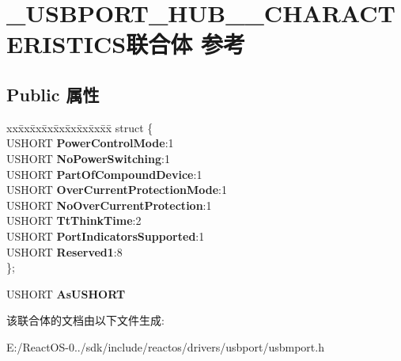 \hypertarget{union___u_s_b_p_o_r_t___h_u_b__20___c_h_a_r_a_c_t_e_r_i_s_t_i_c_s}{}\section{\+\_\+\+U\+S\+B\+P\+O\+R\+T\+\_\+\+H\+U\+B\+\_\+\_\+\+C\+H\+A\+R\+A\+C\+T\+E\+R\+I\+S\+T\+I\+C\+S联合体 参考}
\label{union___u_s_b_p_o_r_t___h_u_b__20___c_h_a_r_a_c_t_e_r_i_s_t_i_c_s}
\subsection*{Public 属性}
\begin{DoxyCompactItemize}
\item 
\mbox{\label{union___u_s_b_p_o_r_t___h_u_b__20___c_h_a_r_a_c_t_e_r_i_s_t_i_c_s_a897e1c1eb0f96ad8eb8ccdc84e99d8e4}} 
\begin{tabbing}
xx\=xx\=xx\=xx\=xx\=xx\=xx\=xx\=xx\=\kill
struct \{\\
\>USHORT {\bfseries PowerControlMode}:1\\
\>USHORT {\bfseries NoPowerSwitching}:1\\
\>USHORT {\bfseries PartOfCompoundDevice}:1\\
\>USHORT {\bfseries OverCurrentProtectionMode}:1\\
\>USHORT {\bfseries NoOverCurrentProtection}:1\\
\>USHORT {\bfseries TtThinkTime}:2\\
\>USHORT {\bfseries PortIndicatorsSupported}:1\\
\>USHORT {\bfseries Reserved1}:8\\
\}; \\

\end{tabbing}\item 
\mbox{\label{union___u_s_b_p_o_r_t___h_u_b__20___c_h_a_r_a_c_t_e_r_i_s_t_i_c_s_a652a30f61f253a88b7ae70c19049d595}} 
U\+S\+H\+O\+RT {\bfseries As\+U\+S\+H\+O\+RT}
\end{DoxyCompactItemize}


该联合体的文档由以下文件生成\+:\begin{DoxyCompactItemize}
\item 
E\+:/\+React\+O\+S-\/0../sdk/include/reactos/drivers/usbport/usbmport.\+h\end{DoxyCompactItemize}
